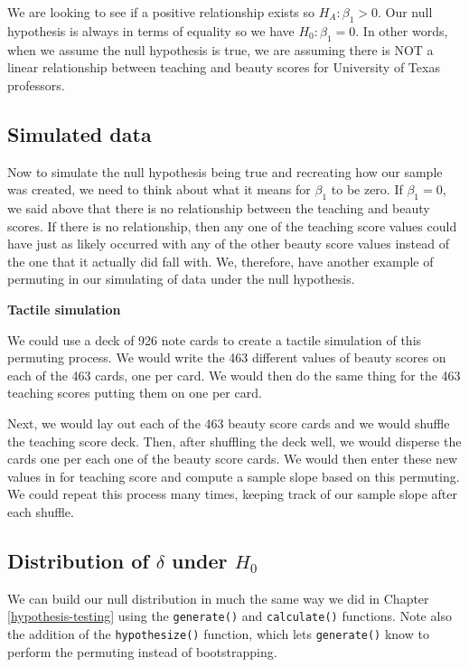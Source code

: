 \documentclass[12pt,]{krantz}
\theoremstyle{definition}
\theoremstyle{definition}
\theoremstyle{definition}
\theoremstyle{remark}
\begin{document}
We are looking to see if a positive relationship exists so
\(H_A: \beta_1 > 0\). Our null hypothesis is always in terms of equality
so we have \(H_0: \beta_1 = 0\). In other words, when we assume the null
hypothesis is true, we are assuming there is NOT a linear relationship
between teaching and beauty scores for University of Texas professors.

\subsection{Simulated data}\label{simulated-data-1}

Now to simulate the null hypothesis being true and recreating how our
sample was created, we need to think about what it means for \(\beta_1\)
to be zero. If \(\beta_1 = 0\), we said above that there is no
relationship between the teaching and beauty scores. If there is no
relationship, then any one of the teaching score values could have just
as likely occurred with any of the other beauty score values instead of
the one that it actually did fall with. We, therefore, have another
example of permuting in our simulating of data under the null
hypothesis.

\textbf{Tactile simulation}

We could use a deck of 926 note cards to create a tactile simulation of
this permuting process. We would write the 463 different values of
beauty scores on each of the 463 cards, one per card. We would then do
the same thing for the 463 teaching scores putting them on one per card.

Next, we would lay out each of the 463 beauty score cards and we would
shuffle the teaching score deck. Then, after shuffling the deck well, we
would disperse the cards one per each one of the beauty score cards. We
would then enter these new values in for teaching score and compute a
sample slope based on this permuting. We could repeat this process many
times, keeping track of our sample slope after each shuffle.

\subsection{\texorpdfstring{Distribution of \(\delta\) under
\(H_0\)}{Distribution of \textbackslash{}delta under H\_0}}\label{distribution-of-delta-under-h_0-1}

We can build our null distribution in much the same way we did in
Chapter \ref{hypothesis-testing} using the \texttt{generate()} and
\texttt{calculate()} functions. Note also the addition of the
\texttt{hypothesize()} function, which lets \texttt{generate()} know to
perform the permuting instead of bootstrapping.
\end{document}
